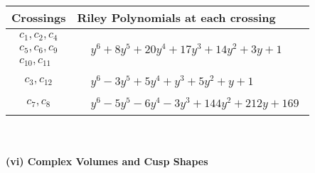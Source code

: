 \documentclass[1p]{elsarticle_modified}
\theoremstyle{definition}
\begin{document}
\begin{tabular}{m{50pt}|m{274pt}}
Crossings & \hspace{64pt}Riley Polynomials at each crossing \\
\hline $$\begin{aligned}c_{1},c_{2},c_{4}\\c_{5},c_{6},c_{9}\\c_{10},c_{11}\end{aligned}$$&$\begin{aligned}
&y^6+8 y^5+20 y^4+17 y^3+14 y^2+3 y+1
\end{aligned}$\\
\hline $$\begin{aligned}c_{3},c_{12}\end{aligned}$$&$\begin{aligned}
&y^6-3 y^5+5 y^4+y^3+5 y^2+y+1
\end{aligned}$\\
\hline $$\begin{aligned}c_{7},c_{8}\end{aligned}$$&$\begin{aligned}
&y^6-5 y^5-6 y^4-3 y^3+144 y^2+212 y+169
\end{aligned}$\\
\hline
\end{tabular}\\~\\
\newpage\flushleft \textbf{(vi) Complex Volumes and Cusp Shapes}
\end{document}
